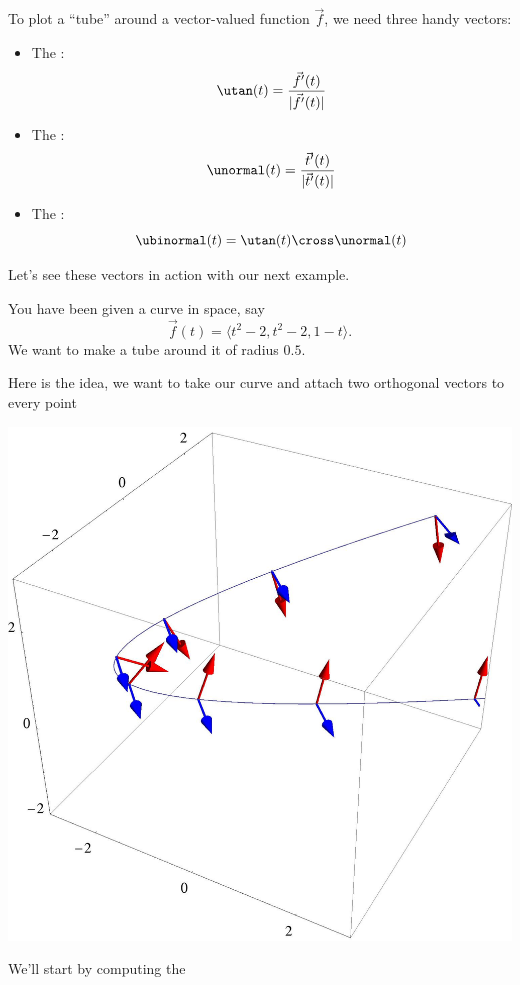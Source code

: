 \documentclass{ximera}
\begin{document}
To plot a ``tube'' around a vector-valued function $\vec{f}$, we need
three handy vectors:
\begin{itemize}
\item The :
  \[
  \utan(t) = \frac{\vec{f}'(t)}{|\vec{f}'(t)|}
  \]
\item The :
  \[
  \unormal(t) = \frac{\vec{t}'(t)}{|\vec{t}'(t)|}
  \]
\item The :
  \[
  \ubinormal(t) = \utan(t) \cross \unormal(t)
  \]
\end{itemize}

Let's see these vectors in action with our next example.

\begin{example}
  You have been given a curve in space, say
  \[
  \vec{f}(t) = \langle t^2-2, t^2-2, 1-t\rangle.
  \]
  We want to make a tube around it of radius $0.5$.
  \begin{explanation}
    Here is the idea, we want to take our curve and attach two
    orthogonal vectors to every point
    \begin{image}
      \includegraphics{paraArrows.jpg}
    \end{image}
    We'll start by computing the

\end{explanation}
\end{example}
\end{document}
